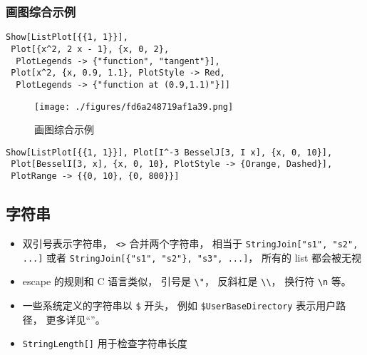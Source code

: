 \subsubsection{画图综合示例}
\begin{lstlisting}[language=mma]
Show[ListPlot[{{1, 1}}],
 Plot[{x^2, 2 x - 1}, {x, 0, 2},
  PlotLegends -> {"function", "tangent"}],
 Plot[x^2, {x, 0.9, 1.1}, PlotStyle -> Red, 
  PlotLegends -> {"function at (0.9,1.1)"}]]
\end{lstlisting}
\begin{figure}[ht]
\centering
\texttt{[image: ./figures/fd6a248719af1a39.png]}
\caption{画图综合示例} \label{fig_Mma_1}
\end{figure}

\begin{lstlisting}[language=mma]
Show[ListPlot[{{1, 1}}], Plot[I^-3 BesselJ[3, I x], {x, 0, 10}], 
 Plot[BesselI[3, x], {x, 0, 10}, PlotStyle -> {Orange, Dashed}], 
 PlotRange -> {{0, 10}, {0, 800}}]
\end{lstlisting}

\subsection{字符串}
\begin{itemize}
\item 双引号表示字符串， \verb`<>` 合并两个字符串， 相当于 \verb`StringJoin["s1", "s2", ...]` 或者 \verb`StringJoin[{"s1", "s2"}, "s3", ...]`， 所有的 list 都会被无视
\item escape 的规则和 C 语言类似， 引号是 \verb`\"`， 反斜杠是 \verb`\\`， 换行符 \verb`\n` 等。
\item 一些系统定义的字符串以 \verb`$` 开头， 例如 \verb`$UserBaseDirectory` 表示用户路径， 更多详见“”。
\item \verb`StringLength[]` 用于检查字符串长度
\end{itemize}

